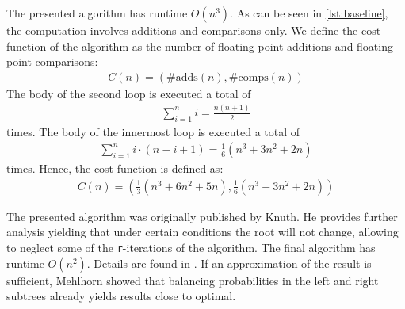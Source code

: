  The presented algorithm has runtime $O(n^3)$. As can
be seen in \autoref{lst:baseline}, the computation involves additions and
comparisons only. We define the cost function of the algorithm as the
number of floating point additions and floating point comparisons:
\begin{align*}
C(n) = (\#\text{adds}(n), \#\text{comps}(n))
\end{align*}
The body of the second loop is executed a total of
\begin{align*}
\sum_{i=1}^{n} i = \frac{n(n+1)}{2}
\end{align*}
times. The body of the innermost loop is executed a total of
\begin{align*}
	\sum_{i=1}^{n} i\cdot(n-i+1) = \frac{1}{6}(n^3+3n^2+2n)
\end{align*}
times. Hence, the cost function is defined as:
\begin{align*}
C(n) = \left(\frac{1}{3}(n^3+6n^2+5n), \frac{1}{6}(n^3+3n^2+2n)\right)
\end{align*}

 The presented algorithm was originally
published by Knuth. He provides further analysis yielding that under
certain conditions the root will not change, allowing to neglect some of
the \texttt{r}-iterations of the algorithm. The final algorithm has runtime
$O(n^2)$. Details are found in \cite{Knuth70}. If an approximation of the
result is sufficient, Mehlhorn \cite{Mehlhorn75} showed that balancing
probabilities in the left and right subtrees already yields results close
to optimal.
